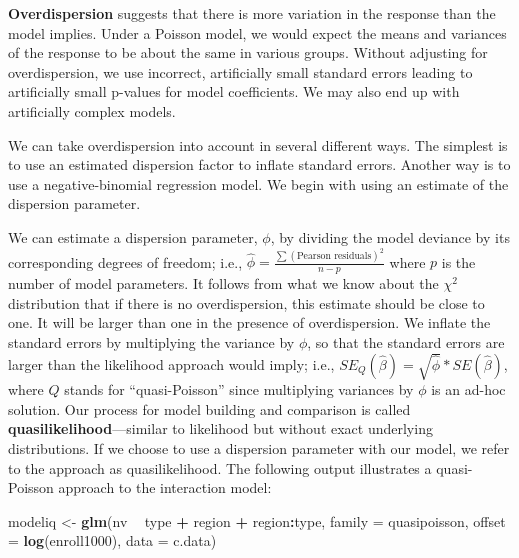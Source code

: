 \documentclass[
]{krantz}
\newenvironment{Shaded}{\begin{snugshade}}{\end{snugshade}}
\newcommand{\DataTypeTok}[1]{\textcolor[rgb]{0.27,0.27,0.27}{#1}}
\newcommand{\KeywordTok}[1]{\textcolor[rgb]{0.27,0.27,0.27}{\textbf{#1}}}
\newcommand{\NormalTok}[1]{#1}
\newcommand{\OperatorTok}[1]{\textcolor[rgb]{0.43,0.43,0.43}{\textbf{#1}}}
\newcommand{\StringTok}[1]{\textcolor[rgb]{0.5,0.5,0.5}{#1}}
\begin{document}
\textbf{Overdispersion}  suggests that there is more variation in the response than the model implies. Under a Poisson model, we would expect the means and variances of the response to be about the same in various groups. Without adjusting for overdispersion, we use incorrect, artificially small standard errors leading to artificially small p-values for model coefficients. We may also end up with artificially complex models.

We can take overdispersion into account in several different ways. The simplest is to use an estimated dispersion factor to inflate standard errors. Another way is to use a negative-binomial regression model. We begin with using an estimate of the dispersion parameter.

We can estimate a dispersion parameter, \(\phi\), by dividing the model deviance by its corresponding degrees of freedom; i.e., \(\hat\phi=\frac{\sum(\textrm{Pearson residuals})^2}{n-p}\) where \(p\) is the number of model parameters. It follows from what we know about the \(\chi^2\) distribution that if there is no overdispersion, this estimate should be close to one. It will be larger than one in the presence of overdispersion. We inflate the standard errors by multiplying the variance by \(\phi\), so that the standard errors are larger than the likelihood approach would imply; i.e., \(SE_Q(\hat\beta)=\sqrt{\hat\phi}*SE(\hat\beta)\), where \(Q\) stands for ``quasi-Poisson''  since multiplying variances by \(\phi\) is an ad-hoc solution. Our process for model building and comparison is called \textbf{quasilikelihood}---similar to likelihood but without exact underlying distributions.  If we choose to use a dispersion parameter with our model, we refer to the approach as quasilikelihood. The following output illustrates a quasi-Poisson approach to the interaction model:

\begin{Shaded}
\begin{Highlighting}[]
\NormalTok{modeliq <-}\StringTok{ }\KeywordTok{glm}\NormalTok{(nv }\OperatorTok{~}\StringTok{ }\NormalTok{type }\OperatorTok{+}\StringTok{ }\NormalTok{region }\OperatorTok{+}\StringTok{ }\NormalTok{region}\OperatorTok{:}\NormalTok{type, }
               \DataTypeTok{family =}\NormalTok{ quasipoisson,}
               \DataTypeTok{offset =} \KeywordTok{log}\NormalTok{(enroll1000), }\DataTypeTok{data =}\NormalTok{ c.data)}
\end{Highlighting}
\end{Shaded}
\end{document}
